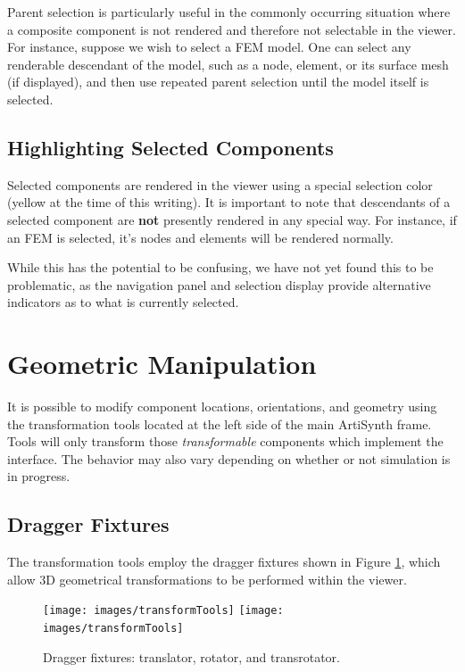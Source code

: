 \documentclass{article}
\begin{document}
Parent selection is particularly useful in the commonly occurring
situation where a composite component is not rendered and therefore
not selectable in the viewer. For instance, suppose we wish to select
a FEM model. One can select any renderable descendant of the model,
such as a node, element, or its surface mesh (if displayed), and then
use repeated parent selection until the model itself is selected.

\subsection{Highlighting Selected Components}

Selected components are rendered in the viewer using a special
selection color (yellow at the time of this writing). It is important
to note that descendants of a selected component are {\bf not} presently
rendered in any special way. For instance, if an FEM is selected, it's
nodes and elements will be rendered normally. 

While this has the potential to be confusing, we have not yet found
this to be problematic, as the navigation panel and selection display
provide alternative indicators as to what is currently selected.

\section{Geometric Manipulation}

It is possible to modify component locations, orientations, and
geometry using the transformation tools located at the left side of
the main ArtiSynth frame.  Tools will only transform those {\it
transformable} components which implement the
 interface. The
behavior may also vary depending on whether or not simulation is in
progress.

\subsection{Dragger Fixtures}
\label{draggerFixturesSec}

The transformation tools employ the dragger fixtures shown
in Figure \ref{transformToolsFig}, which allow 3D geometrical
transformations to be performed within the viewer.

\begin{figure}
\begin{center}
\iflatexml
\texttt{[image: images/transformTools]}
\else
\texttt{[image: images/transformTools]}
\fi
\end{center}
\caption{Dragger fixtures: translator, rotator, and transrotator.}%
\label{transformToolsFig}
\end{figure}
\end{document}
